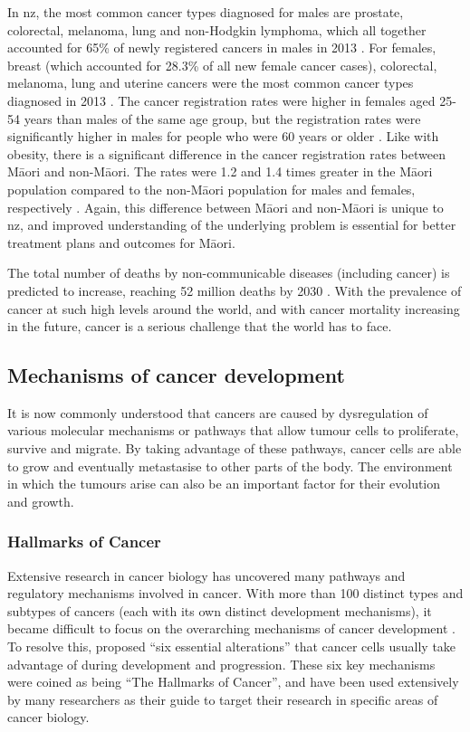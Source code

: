 In \gls{nz}, the most common cancer types diagnosed for males are prostate, colorectal, melanoma, lung and non-Hodgkin lymphoma, which all together accounted for 65\% of newly registered cancers in males in 2013 \citep{Health2016b}.
For females, breast (which accounted for 28.3\% of all new female cancer cases), colorectal, melanoma, lung and uterine cancers were the most common cancer types diagnosed in 2013 \citep{Health2016b}.
The cancer registration rates were higher in females aged 25-54 years than males of the same age group, but the registration rates were significantly higher in males for people who were 60 years or older \citep{Health2016b}.
Like with obesity, there is a significant difference in the cancer registration rates between M\=aori and non-M\=aori.
The rates were 1.2 and 1.4 times greater in the M\=aori population compared to the non-M\=aori population for males and females, respectively \citep{Health2016b}.
Again, this difference between M\=aori and non-M\=aori is unique to \gls{nz}, and improved understanding of the underlying problem is essential for better treatment plans and outcomes for M\=aori.

The total number of deaths by non-communicable diseases (including cancer) is predicted to increase, reaching 52 million deaths by 2030 \citep{WHO2014}.
With the prevalence of cancer at such high levels around the world, and with cancer mortality increasing in the future, cancer is a serious challenge that the world has to face.

\subsection{Mechanisms of cancer development}
\label{sub:mechanisms_of_cancer_development}

It is now commonly understood that cancers are caused by dysregulation of various molecular mechanisms or pathways that allow tumour cells to proliferate, survive and migrate.
By taking advantage of these pathways, cancer cells are able to grow and eventually metastasise to other parts of the body.
The environment in which the tumours arise can also be an important factor for their evolution and growth.

\subsubsection{Hallmarks of Cancer}
\label{subsubsec:cancerhallmarks}

Extensive research in cancer biology has uncovered many pathways and regulatory mechanisms involved in cancer.
With more than 100 distinct types and subtypes of cancers (each with its own distinct development mechanisms), it became difficult to focus on the overarching mechanisms of cancer development \citep{Hanahan2000}.
To resolve this, \citet{Hanahan2000} proposed ``six essential alterations'' that cancer cells usually take advantage of during development and progression.
These six key mechanisms were coined as being ``The Hallmarks of Cancer'', and have been used extensively by many researchers as their guide to target their research in specific areas of cancer biology.

